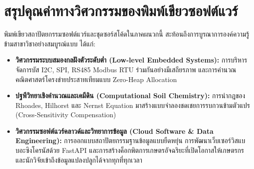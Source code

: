 \section{สรุปคุณค่าทางวิศวกรรมของพิมพ์เขียวซอฟต์แวร์}

พิมพ์เขียวสถาปัตยกรรมซอฟต์แวร์และชุดซอร์สโค้ดในภาคผนวกนี้ สะท้อนถึงการบูรณาการองค์ความรู้ข้ามสาขาวิชาอย่างสมบูรณ์แบบ ได้แก่:
\begin{itemize}[leftmargin=15pt, itemsep=3pt]
    \item \textbf{วิศวกรรมระบบสมองกลฝังตัวระดับต่ำ (Low-level Embedded Systems):} การบริหารจัดการบัส I2C, SPI, RS485 Modbus RTU ร่วมกันอย่างมีเสถียรภาพ และการคำนวณคณิตศาสตร์โครงข่ายประสาทเทียมแบบ Zero-Heap Allocation
    \item \textbf{ปฐพีวิทยาเชิงคำนวณและเคมีดิน (Computational Soil Chemistry):} การนำกฎของ Rhoades, Hilhorst และ Nernst Equation มาสร้างแบบจำลองชดเชยการรบกวนข้ามตัวแปร (Cross-Sensitivity Compensation)
    \item \textbf{วิศวกรรมซอฟต์แวร์คลาวด์และวิทยาการข้อมูล (Cloud Software \& Data Engineering):} การออกแบบสถาปัตยกรรมฐานข้อมูลแบบยืดหยุ่น การพัฒนาเว็บเซอร์วิสแบบอะซิงโครนัสด้วย FastAPI และการสร้างค็อกพิตการเกษตรอัจฉริยะที่เปิดโอกาสให้เกษตรกรและนักวิจัยเข้าถึงข้อมูลแปลงปลูกได้จากทุกที่ทุกเวลา
\end{itemize}
